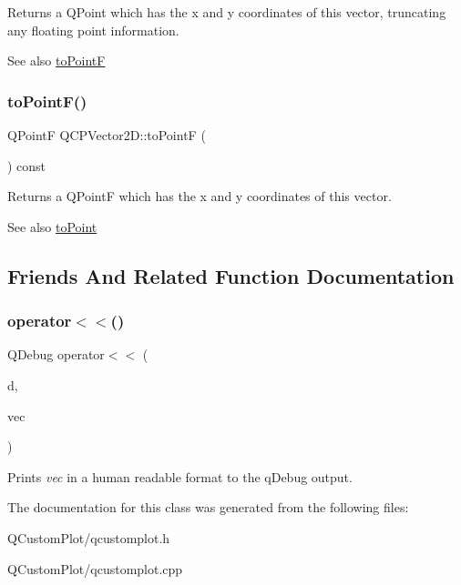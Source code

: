 Returns a Q\+Point which has the x and y coordinates of this vector, truncating any floating point information.

\begin{DoxySeeAlso}{See also}
\mbox{\hyperlink{class_q_c_p_vector2_d_acd7af3f4a62833ada58be3f3021dbbac}{to\+PointF}} 
\end{DoxySeeAlso}
\mbox{\label{class_q_c_p_vector2_d_acd7af3f4a62833ada58be3f3021dbbac}} 
\subsubsection{\texorpdfstring{to\+Point\+F()}{toPointF()}}
{\footnotesize\ttfamily Q\+PointF Q\+C\+P\+Vector2\+D\+::to\+PointF (\begin{DoxyParamCaption}{ }\end{DoxyParamCaption}) const\hspace{0.3cm}{\ttfamily [inline]}}

Returns a Q\+PointF which has the x and y coordinates of this vector.

\begin{DoxySeeAlso}{See also}
\mbox{\hyperlink{class_q_c_p_vector2_d_add3edf75de9b7bf1abc693b973b2e906}{to\+Point}} 
\end{DoxySeeAlso}


\subsection{Friends And Related Function Documentation}
\mbox{\label{class_q_c_p_vector2_d_a6c757af9671d925af4a36c2f58fb7234}} 
\subsubsection{\texorpdfstring{operator$<$$<$()}{operator<<()}}
{\footnotesize\ttfamily Q\+Debug operator$<$$<$ (\begin{DoxyParamCaption}\item[{Q\+Debug}]{d,  }\item[{const \mbox{\hyperlink{class_q_c_p_vector2_d}{Q\+C\+P\+Vector2D}} \&}]{vec }\end{DoxyParamCaption})\hspace{0.3cm}{\ttfamily [related]}}

Prints {\itshape vec} in a human readable format to the q\+Debug output. 

The documentation for this class was generated from the following files\+:\begin{DoxyCompactItemize}
\item 
Q\+Custom\+Plot/qcustomplot.\+h\item 
Q\+Custom\+Plot/qcustomplot.\+cpp\end{DoxyCompactItemize}
